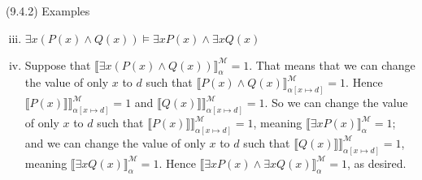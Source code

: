 \begin{frame}{(9.4.2) Examples}

\begin{enumerate}[(i)]

\setcounter{enumi}{2}

\item $\exists x(P(x)\land Q(x))\vDash \exists xP(x)\land \exists xQ(x)$

		\item[] Suppose that $\llbracket\exists x(P(x)\land Q(x))\rrbracket^\mathcal{M}_\alpha=1$. That means that we can change the value of only $x$ to $d$ such that $\llbracket P(x)\land Q(x)\rrbracket^\mathcal{M}_{\alpha[x\mapsto d]}=1$. Hence $\llbracket P(x)\rrbracket\rrbracket^\mathcal{M}_{\alpha[x\mapsto d]}=1$ and $\llbracket Q(x)\rrbracket\rrbracket^\mathcal{M}_{\alpha[x\mapsto d]}=1$. So we can change the value of only $x$ to $d$ such that $\llbracket P(x)\rrbracket\rrbracket^\mathcal{M}_{\alpha[x\mapsto d]}=1$, meaning $\llbracket\exists xP(x)\rrbracket^\mathcal{M}_\alpha=1$; and we can change the value of only $x$ to $d$ such that $\llbracket Q(x)\rrbracket\rrbracket^\mathcal{M}_{\alpha[x\mapsto d]}=1$, meaning $\llbracket\exists xQ(x)\rrbracket^\mathcal{M}_\alpha=1$. Hence $\llbracket\exists xP(x)\land \exists xQ(x)\rrbracket^\mathcal{M}_\alpha=1$, as desired.
		
		\end{enumerate}

\end{frame}

